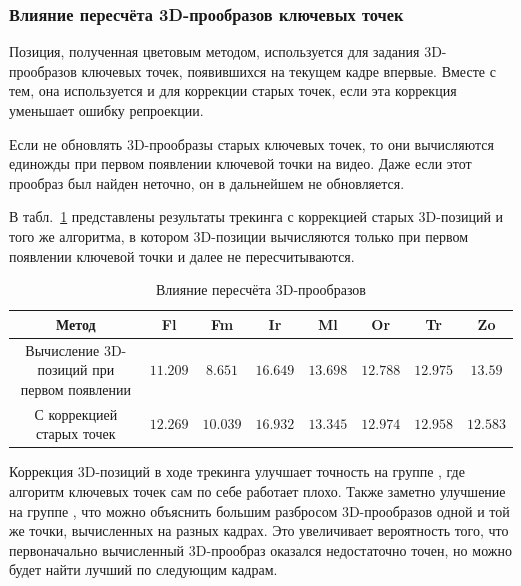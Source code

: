 
\subsubsection{Влияние пересчёта 3D-прообразов ключевых точек}

Позиция, полученная цветовым методом, используется для задания 3D-прообразов
ключевых точек, появившихся на текущем кадре впервые.
Вместе с тем, она используется и для коррекции старых точек, если эта коррекция
уменьшает ошибку репроекции.

Если не обновлять 3D-прообразы старых ключевых точек, то они вычисляются
единожды при первом появлении ключевой точки на видео.
Даже если этот прообраз был найден неточно, он в дальнейшем не обновляется.

В табл.~\ref{tab:reprojection} представлены результаты трекинга с коррекцией
старых 3D-позиций и того же алгоритма, в котором 3D-позиции вычисляются
только при первом появлении ключевой точки и далее не пересчитываются.

\begin{table}[h]
\caption{\label{tab:reprojection}Влияние пересчёта 3D-прообразов}
\begin{center}
\begin{tabular}{|c|c|c|c|c|c|c|c|}
\hline
Метод & Fl & Fm & Ir & Ml & Or & Tr & Zo \\
\hline
Вычисление 3D-позиций при первом появлении & $11.209$ & $8.651$ & $16.649$ &
$\mathbf{13.698}$ & $12.788$ & $\mathbf{12.975}$ &
$\mathbf{13.59}$ \\
\hline
С коррекцией старых точек & $\mathbf{12.269}$ & $\mathbf{10.039}$ &
$\mathbf{16.932}$ & $13.345$ &
$\mathbf{12.974}$ &
$12.958$ & $12.583$ \\
\hline
\end{tabular}
\end{center}
\end{table}

Коррекция 3D-позиций в ходе трекинга улучшает точность на группе , где алгоритм ключевых точек сам по себе работает плохо.
Также заметно улучшение на группе , что можно объяснить
большим разбросом 3D-прообразов одной и той же точки, вычисленных на разных
кадрах.
Это увеличивает вероятность того, что первоначально вычисленный 3D-прообраз
оказался недостаточно точен, но можно будет найти лучший по следующим кадрам.

